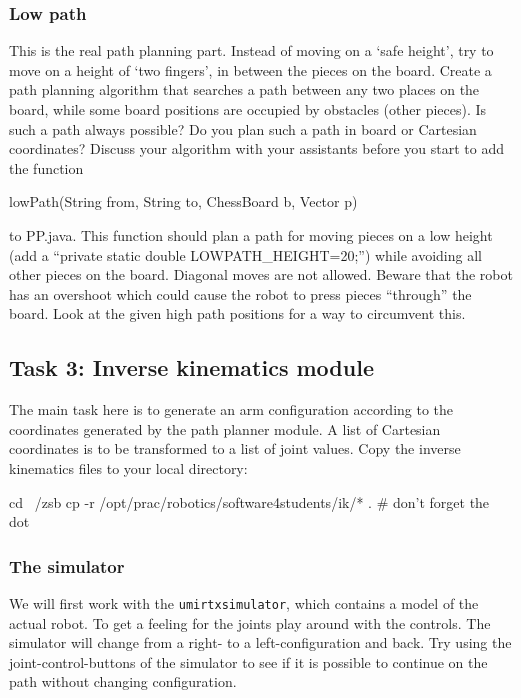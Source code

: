 \documentclass[10pt]{scrartcl}
\begin{document}
\subsubsection{Low path}
This is the real path planning part. Instead of moving on a `safe
height', try to move on a height of `two fingers', in between the
pieces on the board. Create a path planning algorithm that searches a
path between any two places on the board, while some board positions
are occupied by obstacles (other pieces). Is such a path always
possible? Do you plan such a path in board or Cartesian coordinates?
Discuss your algorithm with your assistants before you start to add
the function \centerline{\ttfamily\small lowPath(String from, String to,
ChessBoard b, Vector p)} to PP.java. This function should plan a path
for moving pieces on a low height (add a ``private static double
LOWPATH\_HEIGHT=20;'') while avoiding all other pieces on the board.
Diagonal moves are not allowed. Beware that the robot has an overshoot
which could cause the robot to press pieces ``through'' the board. Look at
the given high path positions for a way to circumvent this.

\subsection{Task 3: Inverse kinematics module}
\label{sec:Inversekinematics}

The main task here is to generate an arm configuration according to the
coordinates generated by the path planner module. A list of Cartesian
coordinates is to be transformed to a list of joint values.
Copy the inverse kinematics files to your local directory:
\begin{verbatimtab}
cd ~/zsb
cp -r /opt/prac/robotics/software4students/ik/* . # don't forget the dot
\end{verbatimtab}

\subsubsection{The simulator}

  We will first work with the {\tt umirtxsimulator}, which contains a model of
  the actual robot. To get a feeling for the joints play around with the
  controls. The simulator will change from a right- to a
  left-configuration and back. Try using the joint-control-buttons of
  the simulator to see if it is possible to continue on the path without
  changing configuration.
\end{document}
